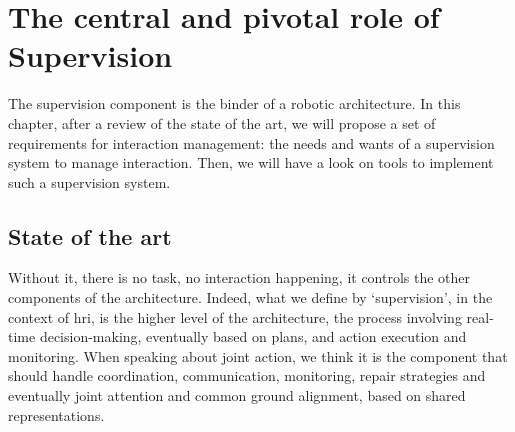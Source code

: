\documentclass[a4paper,11pt,twoside]{StyleThese}
\begin{document}
	\setcounter{chapter}{3} %
	\dominitoc
	\faketableofcontents
	\fi
	
	
\chapter{The central and pivotal role of Supervision}\label{chapter:chap4}
\minitoc
The supervision component is the binder of a robotic architecture. In this chapter, after a review of the state of the art, we will propose a set of requirements for interaction management: the needs and wants of a supervision system to manage interaction. Then, we will have a look on tools to implement such a supervision system.

\section{State of the art}\label{chap4:subsec:state_art_sup}
Without it, there is no task, no interaction happening, it controls the other components of the architecture. Indeed, what we define by `supervision', in the context of \acrshort{hri}, is the higher level of the architecture, the process involving real-time decision-making, eventually based on plans, and action execution and monitoring. When speaking about joint action, we think it is the component that should handle coordination, communication, monitoring, repair strategies and eventually joint attention and common ground alignment, based on shared representations.
\end{document}
